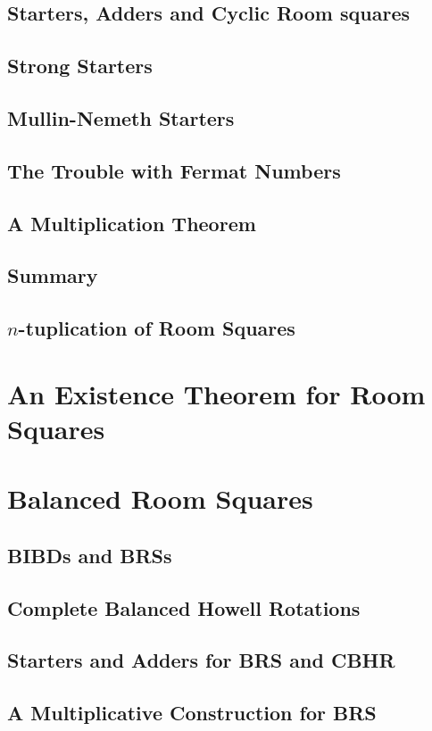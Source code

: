 \documentclass[a4paper, draft]{book}
\begin{document}
\section{Starters, Adders and Cyclic Room squares}
  
\section{Strong Starters}
  \label{sec:strong-starters}
  
\section{Mullin-Nemeth Starters}
  \label{sec:mullin-nemeth}
  
\section{The Trouble with Fermat Numbers}
  \label{sec:trouble-fermat}
  
\section{A Multiplication Theorem}
  
\section{Summary}
  
\section{$n$-tuplication of Room Squares}
  

\chapter{An Existence Theorem for Room Squares}
  \label{ch:existence-theorem}
  

\chapter{Balanced Room Squares}
\label{ch:balanced-room-squares}

\section{BIBDs and BRSs}
  
\section{Complete Balanced Howell Rotations}
  
\section{Starters and Adders for BRS and CBHR}
  
\section{A Multiplicative Construction for BRS}
  



\backmatter
\printbibliography[title=References]
\end{document}
